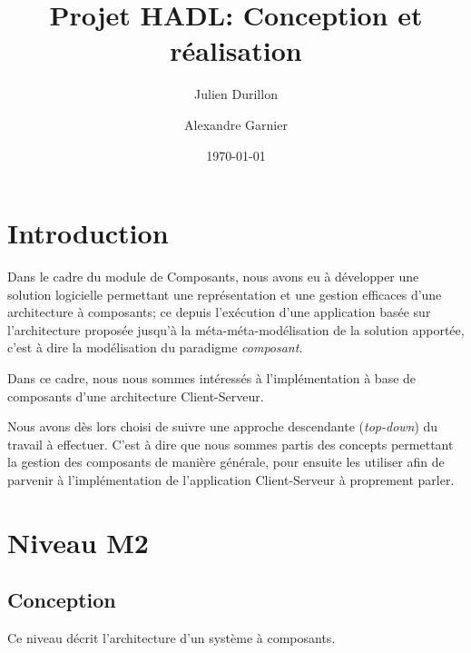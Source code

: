 \documentclass[a4paper, titlepage]{article}
\title{Projet HADL: Conception et réalisation}
\author{Julien Durillon \and Alexandre Garnier}
\date{\today}
\begin{document}
	\maketitle

	\tableofcontents\clearpage
	
	\section*{Introduction}

	  Dans le cadre du module de Composants, nous avons eu à développer une
	  solution logicielle permettant une représentation et une gestion efficaces
	  d'une architecture à composants; ce depuis l'exécution d'une application
	  basée sur l'architecture proposée jusqu'à la méta-méta-modélisation de la
	  solution apportée, c'est à dire la modélisation du paradigme
	  \emph{composant}.

    Dans ce cadre, nous nous sommes intéressés à l'implémentation à base de
    composants d'une architecture Client-Serveur.
    
    Nous avons dès lors choisi de suivre une approche descendante
    (\emph{top-down}) du travail à effectuer. C'est à dire que nous sommes
    partis des concepts permettant la gestion des composants de manière
    générale, pour ensuite les utiliser afin de parvenir à l'implémentation de
    l'application Client-Serveur à proprement parler.

	\section{Niveau M2}
		\subsection{Conception}
			Ce niveau décrit l'architecture d'un système à composants.
		
\end{document}
